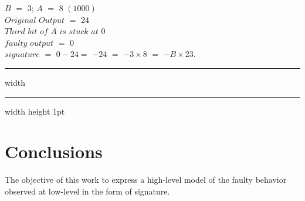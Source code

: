 $B$ $=$ $3$;  $A$ $=$ $8$ $(1000)$ \\
$Original$ $Output$ $=$ $24$ \\
$Third$ $bit$ $of$ $A$ $is$ $stuck$ $at$ $0$\\\; 
$faulty$ $output$ $=$ $0$ \\ 
$signature$ $=$ $ 0 - 24 $$=$ $-24$ $=$ $-3\times 8$ $=$ $-B \times 23$.


\hrule height 2pt width \hsize \kern 1pt \hrule width \hsize height 1pt





\section{Conclusions}
The objective of this work to express a high-level model of the faulty behavior observed at low-level in the form of signature. 